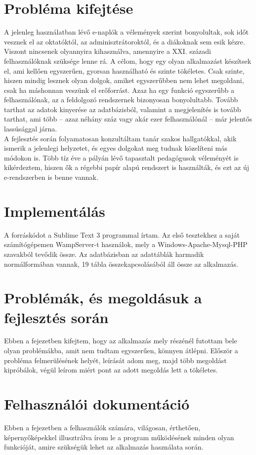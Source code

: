 \documentclass[
]{thesis-ekf}
\begin{document}
\chapter{Probléma kifejtése}
A jelenleg használatban lévő e-naplók a vélemények szerint bonyolultak, sok időt vesznek el az oktatóktól, az adminisztrátoroktól, és a diákoknak sem esik kézre. Viszont nincsenek olyannyira kihasználva, amennyire a XXI. századi felhasználóknak szüksége lenne rá. A célom, hogy egy olyan alkalmazást készítsek el, ami kellően egyszerűen, gyorsan használható és szinte tökéletes. Csak szinte, hiszen mindig lesznek olyan dolgok, amiket egyszerűbben nem lehet megoldani, csak ha máshonnan veszünk el erőforrást. Azaz ha egy funkció egyszerűbb a felhasználónak, az a feldolgozó rendszernek bizonyosan bonyolultabb. Tovább tarthat az adatok kinyerése az adatbázisból, valamint a megjelenítés is tovább tarthat, ami több -- azaz néhány száz vagy akár ezer felhasználónál -- már jelentős lassúsággal járna.\\
A fejlesztés során folyamatosan konzultáltam tanár szakos hallgatókkal, akik ismerik a jelenlegi helyzetet, és egyes dolgokat meg tudnak közelíteni más módokon is. Több tíz éve a pályán lévő tapasztalt pedagógusok véleményét is kikérdeztem, hiszen ők a régebbi papír alapú rendszert is használták, és ezt az új e-rendszerben is benne vannak.
\chapter{Implementálás}
A forráskódot a Sublime Text 3 programmal írtam. Az első tesztekhez a saját számítógépemen WampServer-t használok, mely a Windows-Apache-Mysql-PHP szavakból tevődik össze. Az adatbázisban az adattáblák harmadik normálformában vannak, 19 tábla összekapcsolásából áll össze az alkalmazás.
\chapter{Problémák, és megoldásuk a fejlesztés során}
Ebben a fejezetben kifejtem, hogy az alkalmazás mely részénél futottam bele olyan problémákba, amit nem tudtam egyszerűen, könnyen átlépni. Először a probléma felmerülésének helyét, leírását adom meg, majd több megoldást kipróbálok, végül leírom miért pont az adott megoldás lett a tökéletes.
\chapter{Felhasználói dokumentáció}
Ebben a fejezetben a felhasználók számára, világosan, érthetően, képernyőképekkel illusztrálva írom le a program működésének minden olyan funkcióját, amire szükségük lehet az alkalmazás használata során.
\end{document}
